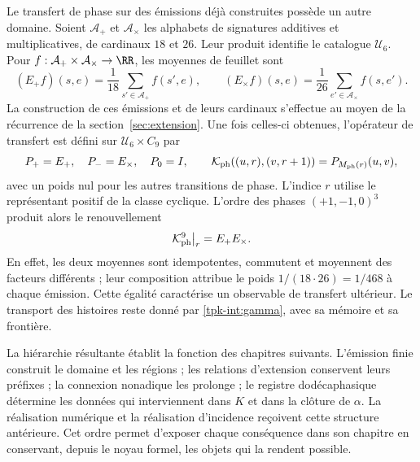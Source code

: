 Le transfert de phase sur des émissions déjà construites possède un autre
domaine. Soient \(\mathcal A_+\) et \(\mathcal A_\times\) les
alphabets de signatures additives et multiplicatives, de cardinaux \(18\)
et \(26\). Leur produit identifie le catalogue \(\mathcal U_6\).
Pour \(f:\mathcal A_+\times\mathcal A_\times\to\RR\),
les moyennes de feuillet sont
\[
 (E_+f)(s,e)=\frac1{18}\sum_{s'\in\mathcal A_+}f(s',e),\qquad
 (E_\times f)(s,e)=\frac1{26}\sum_{e'\in\mathcal A_\times}f(s,e').
\]
La construction de ces émissions et de leurs cardinaux s'effectue au moyen de la récurrence de la section~\ref{sec:extension}. Une fois celles-ci obtenues, l'opérateur de transfert est défini sur \(\mathcal U_6\times C_9\) par
\[
 P_+=E_+,\quad P_-=E_\times,\quad P_0=I,\qquad
 \mathcal K_{\rm ph}((u,r),(v,r+1))=P_{M_{\rm ph}(r)}(u,v),
\]
avec un poids nul pour les autres transitions de phase. L'indice
\(r\) utilise le représentant positif de la classe cyclique.
L'ordre des phases \((+1,-1,0)^3\) produit alors le renouvellement
\[
 \mathcal K_{\rm ph}^{9}\big|_r=E_+E_\times.
\]
En effet, les deux moyennes sont idempotentes, commutent et moyennent des facteurs
différents ; leur composition attribue le poids \(1/(18\cdot26)=1/468\)
à chaque émission. Cette égalité caractérise un observable de transfert
ultérieur. Le transport des histoires reste donné par
\eqref{tpk-int:gamma}, avec sa mémoire et sa frontière.

La hiérarchie résultante établit la fonction des chapitres suivants. L'émission finie construit le domaine et les régions ; les relations d'extension conservent leurs préfixes ; la connexion nonadique les prolonge ; le registre dodécaphasique détermine les données qui interviennent dans \(K\) et dans la clôture de \(\alpha\). La réalisation numérique et la réalisation d'incidence reçoivent cette structure antérieure. Cet ordre permet d'exposer chaque conséquence dans son chapitre en conservant, depuis le noyau formel, les objets qui la rendent possible.
